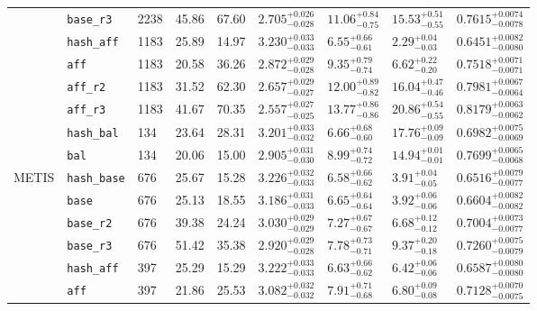 \documentclass[10pt, a4paper, twoside]{article}
\newcommand{\strategy}[1]{\texttt{#1}}
\begin{document}
\begin{minipage}{\textwidth}
\begin{tabular}{|l|l|l|l|l|l|l|l|l|}
\cline{2-9}
 & \strategy{base\_r3} & 2238 & 45.86 & 67.60 & $2.705^{+0.026}_{-0.028}$ & $11.06^{+0.84}_{-0.75}$ & $15.53^{+0.51}_{-0.55}$ & $0.7615^{+0.0074}_{-0.0078}$\\
\cline{2-9}
 & \strategy{hash\_aff} & 1183 & 25.89 & 14.97 & $3.230^{+0.033}_{-0.033}$ & $6.55^{+0.66}_{-0.61}$ & $2.29^{+0.04}_{-0.03}$ & $0.6451^{+0.0082}_{-0.0080}$\\
\cline{2-9}
 & \strategy{aff} & 1183 & 20.58 & 36.26 & $2.872^{+0.029}_{-0.028}$ & $9.35^{+0.79}_{-0.74}$ & $6.62^{+0.22}_{-0.20}$ & $0.7518^{+0.0071}_{-0.0071}$\\
\cline{2-9}
 & \strategy{aff\_r2} & 1183 & 31.52 & 62.30 & $2.657^{+0.029}_{-0.027}$ & $12.00^{+0.89}_{-0.82}$ & $16.04^{+0.47}_{-0.46}$ & $0.7981^{+0.0067}_{-0.0064}$\\
\cline{2-9}
 & \strategy{aff\_r3} & 1183 & 41.67 & 70.35 & $2.557^{+0.027}_{-0.025}$ & $13.77^{+0.86}_{-0.86}$ & $20.86^{+0.54}_{-0.55}$ & $0.8179^{+0.0063}_{-0.0062}$\\
\cline{2-9}
 & \strategy{hash\_bal} & 134 & 23.64 & 28.31 & $3.201^{+0.033}_{-0.032}$ & $6.66^{+0.68}_{-0.60}$ & $17.76^{+0.09}_{-0.09}$ & $0.6982^{+0.0075}_{-0.0069}$\\
\cline{2-9}
 & \strategy{bal} & 134 & 20.06 & 15.00 & $2.905^{+0.031}_{-0.030}$ & $8.99^{+0.74}_{-0.72}$ & $14.94^{+0.01}_{-0.01}$ & $0.7699^{+0.0065}_{-0.0068}$\\
\hline
METIS & \strategy{hash\_base} & 676 & 25.67 & 15.28 & $3.226^{+0.032}_{-0.033}$ & $6.58^{+0.66}_{-0.62}$ & $3.91^{+0.04}_{-0.05}$ & $0.6516^{+0.0079}_{-0.0077}$\\
\cline{2-9}
 & \strategy{base} & 676 & 25.13 & 18.55 & $3.186^{+0.031}_{-0.033}$ & $6.65^{+0.64}_{-0.64}$ & $3.92^{+0.06}_{-0.06}$ & $0.6604^{+0.0082}_{-0.0082}$\\
\cline{2-9}
 & \strategy{base\_r2} & 676 & 39.38 & 24.24 & $3.030^{+0.029}_{-0.029}$ & $7.27^{+0.67}_{-0.67}$ & $6.68^{+0.12}_{-0.12}$ & $0.7004^{+0.0073}_{-0.0077}$\\
\cline{2-9}
 & \strategy{base\_r3} & 676 & 51.42 & 35.38 & $2.920^{+0.029}_{-0.028}$ & $7.78^{+0.73}_{-0.71}$ & $9.37^{+0.20}_{-0.18}$ & $0.7260^{+0.0075}_{-0.0079}$\\
\cline{2-9}
 & \strategy{hash\_aff} & 397 & 25.29 & 15.29 & $3.222^{+0.033}_{-0.033}$ & $6.63^{+0.66}_{-0.62}$ & $6.42^{+0.06}_{-0.06}$ & $0.6587^{+0.0080}_{-0.0080}$\\
\cline{2-9}
 & \strategy{aff} & 397 & 21.86 & 25.53 & $3.082^{+0.032}_{-0.032}$ & $7.91^{+0.71}_{-0.68}$ & $6.80^{+0.09}_{-0.08}$ & $0.7128^{+0.0070}_{-0.0075}$\\

\end{tabular}
\end{minipage}
\end{document}
